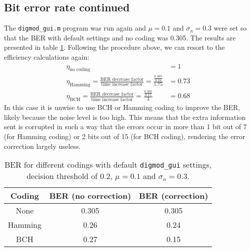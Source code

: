 \documentclass[11pt,titlepage]{report}
\begin{document}
\subsection{Bit error rate continued}
The \texttt{digmod\_gui.m} program was run again and $\mu=0.1$ and $\sigma_n=0.3$ were set so that the BER with default settings and no coding was 0.305. The results are presented in table \ref{tab:task4-diff-coding-mu-sigma}. Following the procedure above, we can resort to the efficiency calculations again:
\begin{align*}
\eta_{\text{no coding}}&=1\\
\eta_{\text{Hamming}}=\frac{\text{BER decrease factor}}{\text{time increase factor}}=\frac{\frac{0.305}{0.24}}{1.75}&=0.73\\
\eta_{\text{BCH}}=\frac{\text{BER decrease factor}}{\text{time increase factor}}=\frac{\frac{0.305}{0.15}}{3}&=0.68
\end{align*}
In this case it is unwise to use BCH or Hamming coding to improve the BER, likely because the noise level is too high. This means that the extra information sent is corrupted in such a way that the errors occur in more than 1 bit out of 7 (for Hamming coding) or 2 bits out of 15 (for BCH coding), rendering the error correction largely useless.
\begin{table}[H]
	\centering
	\caption{BER for different codings with default \texttt{digmod\_gui} settings, decision threshold of 0.2, $\mu=0.1$ and $\sigma_n=0.3$.}
	\label{tab:task4-diff-coding-mu-sigma}
	\begin{tabular}{c c c}
		\hline\hline
		Coding & BER (no correction) & BER (correction)\\
		\hline
		None & 0.305 & 0.305\\
		Hamming & 0.26 & 0.24 \\
		BCH & 0.27 & 0.15\\
		\hline
	\end{tabular}
\end{table}
\end{document}
